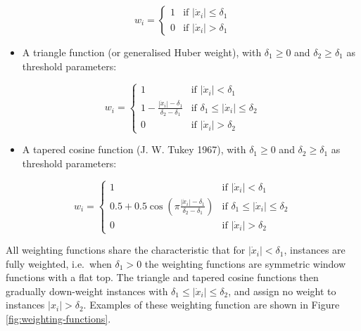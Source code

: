 \documentclass[
  a4paper,
]{article}
\providecommand{\tightlist}{%
  \setlength{\itemsep}{0pt}\setlength{\parskip}{0pt}}
\begin{document}
\begin{equation}
w_i =
\begin{cases}
1 & \text{if } \left| \dot{x}_i \right| \leq \delta_1\\
0 & \text{if } \left| \dot{x}_i \right| > \delta_1
\end{cases}
\end{equation}

\begin{itemize}
\tightlist
\item
  A triangle function (or generalised Huber weight), with
  \(\delta_1 \geq 0\) and \(\delta_2 \geq \delta_1\) as threshold
  parameters:
\end{itemize}

\begin{equation}
w_i =
\begin{cases}
1 & \text{if } \left| \dot{x}_i \right| < \delta_1\\
1 - \frac{\left| \dot{x}_i \right| - \delta_1}{\delta_2 - \delta_1} & \text{if } \delta_1 \leq \left| \dot{x}_i \right| \leq \delta_2 \\
0 & \text{if } \left| \dot{x}_i \right| > \delta_2
\end{cases}
\end{equation}

\begin{itemize}
\tightlist
\item
  A tapered cosine function (J. W. Tukey 1967), with \(\delta_1 \geq 0\)
  and \(\delta_2 \geq \delta_1\) as threshold parameters:
\end{itemize}

\begin{equation}
w_i =
\begin{cases}
1 & \text{if } \left| \dot{x}_i \right| < \delta_1\\
0.5 + 0.5 \cos\left(\pi \frac{\left| \dot{x}_i \right| - \delta_1}{\delta_2 - \delta_1} \right) & \text{if } \delta_1 \leq \left| \dot{x}_i \right| \leq \delta_2 \\
0 & \text{if } \left| \dot{x}_i \right| > \delta_2
\end{cases}
\end{equation}

All weighting functions share the characteristic that for
\(\left| \dot{x}_i \right|< \delta_1\), instances are fully weighted,
i.e.~when \(\delta_1 > 0\) the weighting functions are symmetric window
functions with a flat top. The triangle and tapered cosine functions
then gradually down-weight instances with
\(\delta_1 \leq \left| \dot{x}_i \right| \leq \delta_2\), and assign no
weight to instances \(\left| x_i \right| > \delta_2\). Examples of these
weighting function are shown in Figure \ref{fig:weighting-functions}.
\end{document}
